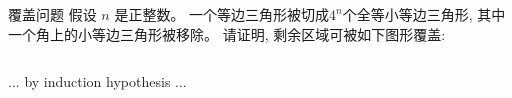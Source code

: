 
\begin{frame}
  \begin{center}
    \begin{exampleblock}{覆盖问题}
      假设 $n$ 是正整数。
      一个等边三角形被切成$4^{n}$个全等小等边三角形, 其中一个角上的小等边三角形被移除。
      请证明, 剩余区域可被如下图形覆盖:
    \end{exampleblock}

  \end{center}
\end{frame}

\begin{frame}{}

  \pause
  \begin{columns}
      \pause
  \end{columns}
\end{frame}

\begin{frame}
  \begin{center}
    \begin{description}
      \setlength{\itemsep}{15pt}
      \item[Base Case:]
      \item[Induction Hypothesis:]
      \item[Induction Step:] $\dots$ by induction hypothesis $\dots$
    \end{description}
  \end{center}
\end{frame}
